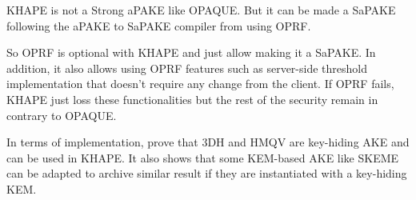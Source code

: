 \documentclass[../report.tex]{subfiles}
\begin{document}
KHAPE is not a Strong aPAKE like OPAQUE. But it can be made a SaPAKE following the aPAKE to SaPAKE compiler from \cite{OPAQUE_Paper} using OPRF.

So OPRF is optional with KHAPE and just allow making it a SaPAKE. In addition, it also allows using OPRF features such as server-side threshold implementation that doesn't require any change from the client. If OPRF fails, KHAPE just loss these functionalities but the rest of the security remain in contrary to OPAQUE.


In terms of implementation, \cite{KHAPE_Paper} prove that 3DH and HMQV are key-hiding AKE and can be used in KHAPE. %
It also shows that some KEM-based AKE like SKEME can be adapted to archive similar result if they are instantiated with a key-hiding KEM. %


% 
% 








\paragraph{}
\end{document}
